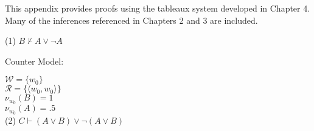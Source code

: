 



%



This appendix provides proofs using the tableaux system developed in Chapter 4. Many of the inferences referenced in Chapters 2 and 3 are included.

(1) $ B\nvdash  A \vee  \neg A $


Counter Model: 

\noindent $\mathcal{W} = \{ w_0\} $\\
$\mathcal{R} = \{ \langle w_0,w_0 \rangle \} $\\
$ \mathcal{\nu}_{w_0}(B)=1 $ \\
$ \mathcal{\nu}_{w_0}(A)=.5 $ \\




(2) $ C\vdash  (A \vee  B) \vee  \neg (A \vee  B) $


